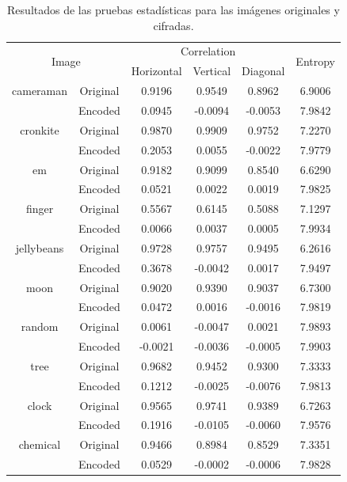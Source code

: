 \documentclass[12pt,a4paper]{article}
\begin{document}
\begin{table}[h!]
    \centering
    \begin{tabular*}{\linewidth}{@{\extracolsep{\fill}} c c c c c c}
    \hline
    \multicolumn{2}{c}{\multirow{2}{*}{Image}}  & \multicolumn{3}{c}{Correlation} & \multirow{2}{*}{Entropy}\\
    \multicolumn{2}{l}{}  & Horizontal & Vertical & Diagonal &  \\
    \hline
    cameraman &  Original & 0.9196 & 0.9549 & 0.8962 & 6.9006 \\
        & Encoded & 0.0945 & -0.0094 & -0.0053 & 7.9842 \\
    cronkite & Original & 0.9870 & 0.9909 & 0.9752 & 7.2270 \\
        & Encoded & 0.2053 & 0.0055 & -0.0022 & 7.9779 \\
    em & Original & 0.9182 & 0.9099 & 0.8540 & 6.6290 \\
        & Encoded & 0.0521 & 0.0022 & 0.0019 & 7.9825 \\
    finger & Original & 0.5567 & 0.6145 & 0.5088 & 7.1297 \\
        & Encoded & 0.0066 & 0.0037 & 0.0005 & 7.9934 \\
    jellybeans & Original & 0.9728 & 0.9757 & 0.9495 & 6.2616 \\
        & Encoded & 0.3678 & -0.0042 & 0.0017 & 7.9497 \\
    moon & Original & 0.9020 & 0.9390 & 0.9037 & 6.7300 \\
        & Encoded & 0.0472 & 0.0016 & -0.0016 & 7.9819 \\
    random & Original & 0.0061 & -0.0047 & 0.0021 & 7.9893 \\
        & Encoded & -0.0021 & -0.0036 & -0.0005 & 7.9903 \\
    tree & Original & 0.9682 & 0.9452 & 0.9300 & 7.3333 \\
        & Encoded & 0.1212 & -0.0025 & -0.0076 & 7.9813 \\
    clock & Original & 0.9565 & 0.9741 & 0.9389 & 6.7263 \\
        & Encoded & 0.1916 & -0.0105 & -0.0060 & 7.9576 \\
    chemical & Original & 0.9466 & 0.8984 & 0.8529 & 7.3351 \\
        & Encoded & 0.0529 & -0.0002 & -0.0006 & 7.9828 \\
    \hline    
    \end{tabular*}
    \caption{Resultados de las pruebas estadísticas para las imágenes originales y cifradas.}
    \label{table:statistical_analysis}
\end{table}
\end{document}
